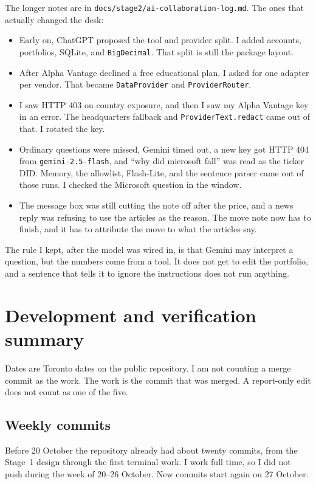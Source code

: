 \documentclass[11pt]{article}
\begin{document}
The longer notes are in \texttt{docs/stage2/ai-collaboration-log.md}. The ones that actually changed the desk:

\begin{itemize}
\item Early on, ChatGPT proposed the tool and provider split. I added accounts, portfolios, SQLite, and \texttt{BigDecimal}. That split is still the package layout.
\item After Alpha Vantage declined a free educational plan, I asked for one adapter per vendor. That became \texttt{DataProvider} and \texttt{ProviderRouter}.
\item I saw HTTP 403 on country exposure, and then I saw my Alpha Vantage key in an error. The headquarters fallback and \texttt{ProviderText.redact} came out of that. I rotated the key.
\item Ordinary questions were missed, Gemini timed out, a new key got HTTP 404 from \texttt{gemini-2.5-flash}, and ``why did microsoft fall'' was read as the ticker DID. Memory, the allowlist, Flash-Lite, and the sentence parser came out of those runs. I checked the Microsoft question in the window.
\item The message box was still cutting the note off after the price, and a news reply was refusing to use the articles as the reason. The move note now has to finish, and it has to attribute the move to what the articles say.
\end{itemize}

The rule I kept, after the model was wired in, is that Gemini may interpret a question, but the numbers come from a tool. It does not get to edit the portfolio, and a sentence that tells it to ignore the instructions does not run anything.

\section{Development and verification summary}

Dates are Toronto dates on the public repository. I am not counting a merge commit as the work. The work is the commit that was merged. A report-only edit does not count as one of the five.

\subsection{Weekly commits}
Before 20 October the repository already had about twenty commits, from the Stage~1 design through the first terminal work. I work full time, so I did not push during the week of 20--26 October. New commits start again on 27 October.
\end{document}
